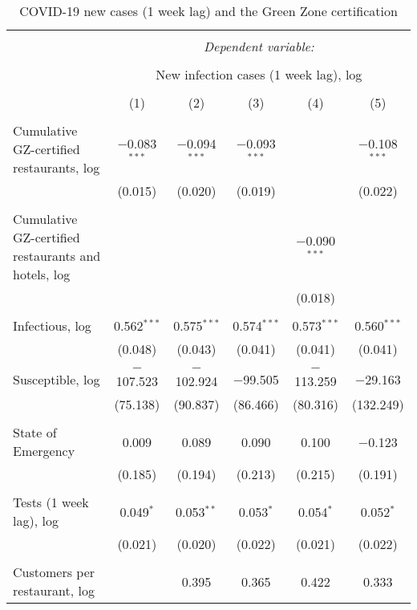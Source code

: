 
\begin{table}[!htbp] \centering 
  \caption{COVID-19 new cases (1 week lag) and the Green Zone certification} 
  \label{} 
\scriptsize 
\begin{tabular}{@{\extracolsep{1pt}}lccccc} 
\\[-1.8ex]\hline 
\hline \\[-1.8ex] 
 & \multicolumn{5}{c}{\textit{Dependent variable:}} \\ 
\cline{2-6} 
\\[-1.8ex] & \multicolumn{5}{c}{New infection cases (1 week lag), log} \\ 
\\[-1.8ex] & (1) & (2) & (3) & (4) & (5)\\ 
\hline \\[-1.8ex] 
 Cumulative GZ-certified restaurants, log & $-$0.083$^{***}$ & $-$0.094$^{***}$ & $-$0.093$^{***}$ &  & $-$0.108$^{***}$ \\ 
  & (0.015) & (0.020) & (0.019) &  & (0.022) \\ 
  & & & & & \\ 
 Cumulative GZ-certified restaurants and hotels, log &  &  &  & $-$0.090$^{***}$ &  \\ 
  &  &  &  & (0.018) &  \\ 
  & & & & & \\ 
 Infectious, log & 0.562$^{***}$ & 0.575$^{***}$ & 0.574$^{***}$ & 0.573$^{***}$ & 0.560$^{***}$ \\ 
  & (0.048) & (0.043) & (0.041) & (0.041) & (0.041) \\ 
  & & & & & \\ 
 Susceptible, log & $-$107.523 & $-$102.924 & $-$99.505 & $-$113.259 & $-$29.163 \\ 
  & (75.138) & (90.837) & (86.466) & (80.316) & (132.249) \\ 
  & & & & & \\ 
 State of Emergency & 0.009 & 0.089 & 0.090 & 0.100 & $-$0.123 \\ 
  & (0.185) & (0.194) & (0.213) & (0.215) & (0.191) \\ 
  & & & & & \\ 
 Tests (1 week lag), log & 0.049$^{*}$ & 0.053$^{**}$ & 0.053$^{*}$ & 0.054$^{*}$ & 0.052$^{*}$ \\ 
  & (0.021) & (0.020) & (0.022) & (0.021) & (0.022) \\ 
  & & & & & \\ 
 Customers per restaurant, log &  & 0.395 & 0.365 & 0.422 & 0.333 \\ 

\end{tabular}
\end{table}
